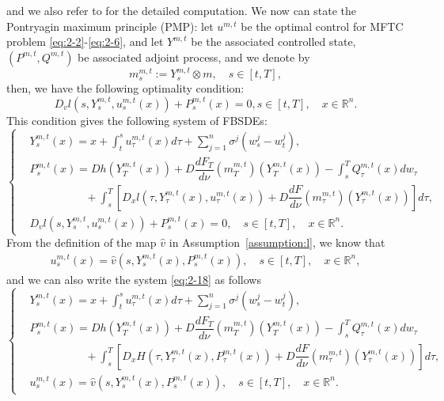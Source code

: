 \documentclass[11pt]{article}
\numberwithin{equation}{section}
\newcommand{\brn}{{\mathbb{R}^n}}
\newcommand{\1}{\mbox{1\hspace{-1mm}I}}
\begin{document}
and we also refer to \cite{AB8} for the detailed computation. We now can state the Pontryagin maximum principle (PMP): let $u^{m,t}$ be the optimal control for MFTC problem \eqref{eq:2-2}-\eqref{eq:2-6}, and let $Y^{m,t}$ be the associated controlled state, $\left(P^{m,t},Q^{m,t}\right)$ be associated adjoint process, and we denote by 
\begin{equation}
    m^{m,t}_s:=Y^{m,t}_s\otimes m,\quad s\in[t,T], \label{eq:2-15}
\end{equation}
then, we have the following optimality condition:
\begin{equation}\label{maximum_principle}
    D_{v}l\left(s,Y^{m,t}_s,u^{m,t}_s(x)\right)+P^{m,t}_s(x)=0, s\in[t,T],\quad x\in\brn.
\end{equation}
This condition gives the following system of FBSDEs:
\begin{equation}\label{eq:2-18}
    \left\{
    \begin{aligned}
        &Y^{m,t}_s(x)=x+\int_t^s u^{m,t}_\tau (x)d\tau+\sum_{j=1}^{n}\sigma^{j}\left(w^j_s-w^j_t\right),\\
        &P^{m,t}_s(x)= Dh\left(Y^{m,t}_T(x)\right)+D\dfrac{dF_{T}}{d\nu}\left(m^{m,t}_T\right)\left(Y^{m,t}_T(x)\right) - \int_s^T Q^{m,t}_\tau (x) dw_\tau\\
        &\quad\qquad\qquad + \int_s^T \left[D_{x}l\left(\tau,Y^{m,t}_\tau(x),u^{m,t}_\tau(x)\right)+D\dfrac{dF}{d\nu}\left(m^{m,t}_\tau\right)\left(Y^{m,t}_\tau(x)\right)\right]d\tau,\\
        &D_{v}l\left(s,Y^{m,t}_s,u^{m,t}_s(x)\right)+P^{m,t}_s(x)=0,\quad s\in[t,T],\quad x\in\brn.
    \end{aligned}
    \right.
\end{equation}
From the definition of the map $\widehat{v}$ in Assumption~\ref{assumption:l}, we know that 
\begin{align}\label{eq:2-102}
    u^{m,t}_s(x)=\widehat{v}\left(s,Y^{m,t}_s(x),P^{m,t}_s(x)\right),\quad s\in[t,T],\quad x\in\brn,
\end{align}
and we can also write the system \eqref{eq:2-18} as follows 
\begin{equation}\label{eq:2-101}
    \left\{
    \begin{aligned}
        &Y^{m,t}_s(x)=x+\int_t^s u^{m,t}_\tau (x)d\tau+\sum_{j=1}^{n}\sigma^{j}\left(w^j_s-w^j_t\right),\\
        &P^{m,t}_s(x)= Dh\left(Y^{m,t}_T(x)\right)+D\dfrac{dF_{T}}{d\nu}\left(m^{m,t}_T\right)\left(Y^{m,t}_T(x)\right) - \int_s^T Q^{m,t}_\tau (x) dw_\tau\\
        &\quad\qquad\qquad + \int_s^T \left[D_x H\left(\tau,Y^{m,t}_\tau(x),P^{m,t}_\tau(x)\right)+D\dfrac{dF}{d\nu}\left(m^{m,t}_\tau\right)\left(Y^{m,t}_\tau(x)\right)\right]d\tau,\\
        &u^{m,t}_s(x)=\widehat{v}\left(s,Y^{m,t}_s(x),P^{m,t}_s(x)\right),\quad s\in[t,T],\quad x\in\brn.
    \end{aligned}
    \right.
\end{equation}
\end{document}
